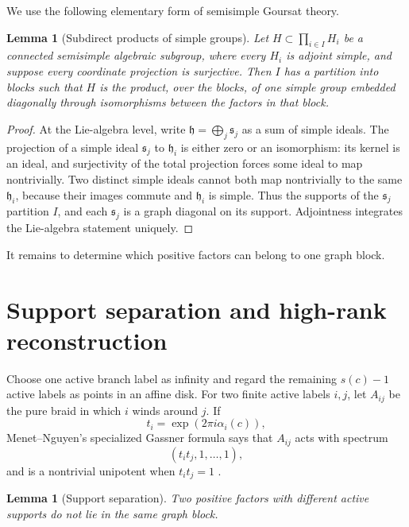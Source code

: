 \documentclass[11pt]{article}
\newtheorem{lemma}[theorem]{Lemma}
\theoremstyle{definition}
\theoremstyle{remark}
\begin{document}
We use the following elementary form of semisimple Goursat theory.

\begin{lemma}[Subdirect products of simple groups]\label{lem:goursat}
Let $H\subset\prod_{i\in I}H_i$ be a connected semisimple algebraic subgroup, where every $H_i$ is adjoint simple, and suppose every coordinate projection is surjective.  Then $I$ has a partition into blocks such that $H$ is the product, over the blocks, of one simple group embedded diagonally through isomorphisms between the factors in that block.
\end{lemma}

\begin{proof}
At the Lie-algebra level, write
$\mathfrak h=\bigoplus_j\mathfrak s_j$ as a sum of simple ideals.  The projection of a simple ideal $\mathfrak s_j$ to $\mathfrak h_i$ is either zero or an isomorphism: its kernel is an ideal, and surjectivity of the total projection forces some ideal to map nontrivially.  Two distinct simple ideals cannot both map nontrivially to the same $\mathfrak h_i$, because their images commute and $\mathfrak h_i$ is simple.  Thus the supports of the $\mathfrak s_j$ partition $I$, and each $\mathfrak s_j$ is a graph diagonal on its support.  Adjointness integrates the Lie-algebra statement uniquely.
\end{proof}

It remains to determine which positive factors can belong to one graph block.

\section{Support separation and high-rank reconstruction}

Choose one active branch label as infinity and regard the remaining $s(c)-1$ active labels as points in an affine disk.  For two finite active labels $i,j$, let $A_{ij}$ be the pure braid in which $i$ winds around $j$.  If
\[
 t_i=\exp(2\pi i\alpha_i(c)),
\]
Menet--Nguyen's specialized Gassner formula says that $A_{ij}$ acts with spectrum
\begin{equation}\label{eq:pair-spectrum}
 (t_it_j,1,\ldots,1),
\end{equation}
and is a nontrivial unipotent when $t_it_j=1$ \cite[Theorem~2.5 and Corollary~2.7]{MN}.

\begin{lemma}[Support separation]\label{lem:support-separation}
Two positive factors with different active supports do not lie in the same graph block.
\end{lemma}
\end{document}
